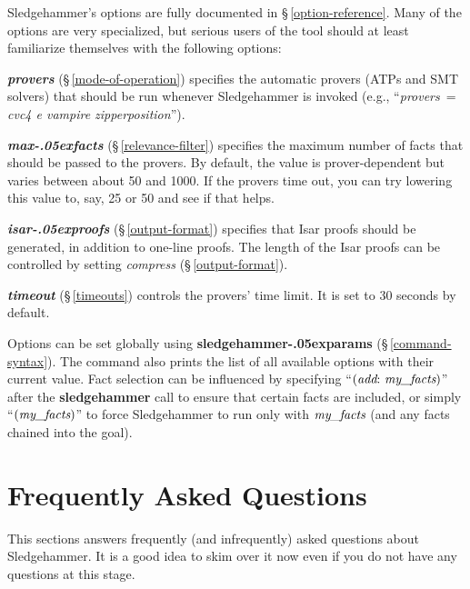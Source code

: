 \documentclass[a4paper,12pt]{article}
\let\oldS=\S
\def\S{\oldS\,}
\renewcommand\_{\hbox{\textunderscore\kern-.05ex}}
\begin{document}

Sledgehammer's options are fully documented in \S\ref{option-reference}. Many of
the options are very specialized, but serious users of the tool should at least
familiarize themselves with the following options:

\begin{enum}
\item[\labelitemi] \textbf{\textit{provers}} (\S\ref{mode-of-operation}) specifies
the automatic provers (ATPs and SMT solvers) that should be run whenever
Sledgehammer is invoked (e.g., ``\textit{provers}~= \textit{cvc4 e
vampire zipperposition\/}'').

\item[\labelitemi] \textbf{\textit{max\_facts}} (\S\ref{relevance-filter})
specifies the maximum number of facts that should be passed to the provers. By
default, the value is prover-dependent but varies between about 50 and 1000. If
the provers time out, you can try lowering this value to, say, 25 or 50 and see
if that helps.

\item[\labelitemi] \textbf{\textit{isar\_proofs}} (\S\ref{output-format}) specifies
that Isar proofs should be generated, in addition to one-line proofs. The length
of the Isar proofs can be controlled by setting \textit{compress}
(\S\ref{output-format}).

\item[\labelitemi] \textbf{\textit{timeout}} (\S\ref{timeouts}) controls the
provers' time limit. It is set to 30 seconds by default.
\end{enum}

Options can be set globally using \textbf{sledgehammer\_params}
(\S\ref{command-syntax}). The command also prints the list of all available
options with their current value. Fact selection can be influenced by specifying
``$(\textit{add}{:}~\textit{my\_facts})$'' after the \textbf{sledgehammer} call
to ensure that certain facts are included, or simply ``$(\textit{my\_facts})$''
to force Sledgehammer to run only with $\textit{my\_facts}$ (and any facts
chained into the goal).


\section{Frequently Asked Questions}
\label{frequently-asked-questions}

This sections answers frequently (and infrequently) asked questions about
Sledgehammer. It is a good idea to skim over it now even if you do not have any
questions at this stage.
\end{document}
